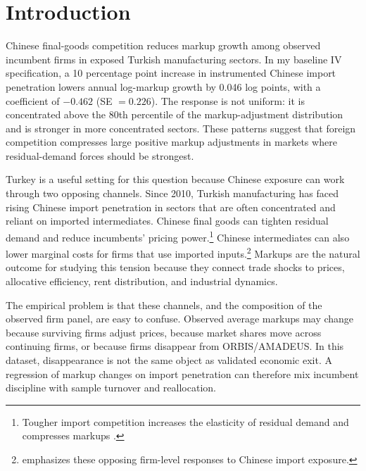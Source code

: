 ﻿\documentclass[12pt]{article}
\begin{document}
\section{Introduction}

Chinese final-goods competition reduces markup growth among observed incumbent firms in exposed Turkish manufacturing sectors. In my baseline IV specification, a 10 percentage point increase in instrumented Chinese import penetration lowers annual log-markup growth by 0.046 log points, with a coefficient of $-0.462$ (SE $=0.226$). The response is not uniform: it is concentrated above the 80th percentile of the markup-adjustment distribution and is stronger in more concentrated sectors. These patterns suggest that foreign competition compresses large positive markup adjustments in markets where residual-demand forces should be strongest.

Turkey is a useful setting for this question because Chinese exposure can work through two opposing channels. Since 2010, Turkish manufacturing has faced rising Chinese import penetration in sectors that are often concentrated and reliant on imported intermediates. Chinese final goods can tighten residual demand and reduce incumbents' pricing power.\footnote{Tougher import competition increases the elasticity of residual demand and compresses markups \parencite{melitzMarketSizeTrade2008, edmondCompetitionMarkupsGains2015}.} Chinese intermediates can also lower marginal costs for firms that use imported inputs.\footnote{\textcite{aghionOpposingFirmLevelResponses2024} emphasizes these opposing firm-level responses to Chinese import exposure.} Markups are the natural outcome for studying this tension because they connect trade shocks to prices, allocative efficiency, rent distribution, and industrial dynamics.

The empirical problem is that these channels, and the composition of the observed firm panel, are easy to confuse. Observed average markups may change because surviving firms adjust prices, because market shares move across continuing firms, or because firms disappear from ORBIS/AMADEUS. In this dataset, disappearance is not the same object as validated economic exit. A regression of markup changes on import penetration can therefore mix incumbent discipline with sample turnover and reallocation.
\end{document}
